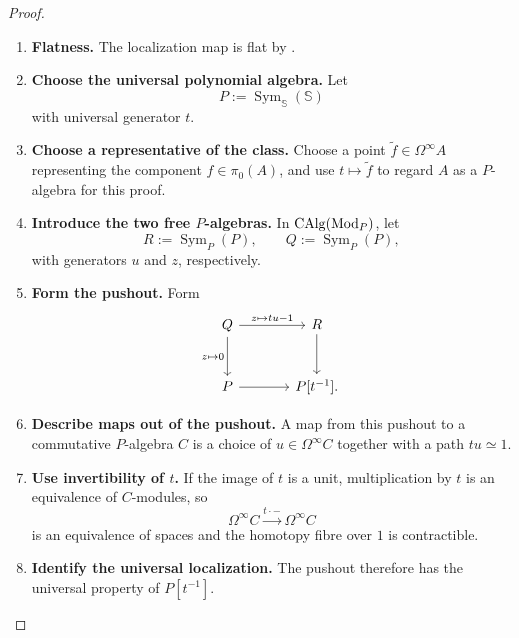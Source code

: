 \begin{proof}
\leavevmode
\begin{enumerate}[label=\textup{(\arabic*)}]
    \item \textbf{Flatness.}
    The localization map is flat by
    .

    \item \textbf{Choose the universal polynomial algebra.}
    Let
    \[
        P:=\operatorname{Sym}_{\mathbb S}(\mathbb S)
    \]
    with universal generator \(t\).

    \item \textbf{Choose a representative of the class.}
    Choose a point
    \(\widetilde f\in\Omega^\infty A\) representing the component
    \(f\in\pi_0(A)\), and use \(t\mapsto\widetilde f\) to regard \(A\)
    as a \(P\)-algebra for this proof.

    \item \textbf{Introduce the two free $P$-algebras.}
    In \(\operatorname{CAlg}(\operatorname{Mod}_P)\), let
    \[
        R:=\operatorname{Sym}_P(P),
        \qquad
        Q:=\operatorname{Sym}_P(P),
    \]
    with generators \(u\) and \(z\), respectively.

    \item \textbf{Form the pushout.}
    Form
    \[
    \begin{tikzcd}[column sep=large, row sep=large]
        Q
            \arrow[r, "{z\mapsto tu-1}"]
            \arrow[d, "{z\mapsto0}"']
        &
        R
            \arrow[d]
        \\
        P
            \arrow[r]
        &
        P[t^{-1}].
    \end{tikzcd}
    \]

    \item \textbf{Describe maps out of the pushout.}
    A map from this pushout to a commutative \(P\)-algebra \(C\) is a choice
    of \(u\in\Omega^\infty C\) together with a path \(tu\simeq1\).

    \item \textbf{Use invertibility of $t$.}
    If the
    image of \(t\) is a unit, multiplication by \(t\) is an equivalence of
    \(C\)-modules, so
    \[
        \Omega^\infty C\xrightarrow{t\cdot-}\Omega^\infty C
    \]
    is an equivalence of spaces and the homotopy fibre over \(1\) is
    contractible.

    \item \textbf{Identify the universal localization.}
    The pushout therefore has the universal property of
    \(P[t^{-1}]\).


\end{enumerate}
\end{proof}
